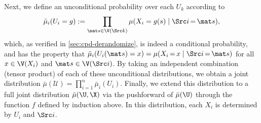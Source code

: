 \begin{subappendices}
\begin{lproof}
    Next, we define an unconditional probability over each $U_k$ according to
    \[
        \bar\mu_i(U_i = g) := \prod_{\mat s \in \V(\Src k)} \mu(X_i = g(s) \mid \Src i \,{=}\, \mat s),
    \]
    which, as verified in \cref{sec:cpd-derandomize}, is indeed a conditional probability, and has the property that
    $\bar\mu_i(U_i(\mat s) = x) = \mu(X_i \,{=}\, x \mid \Src i \,{=}\, \mat s)$ for all $x \in \V(X_i)$ and $\mat s \in \V(\Src i)$.
    By taking an independent combination (tensor product) of each of these unconditional distributions, we obtain a joint distribution 
    $\bar\mu(\mathcal U) = \prod_{i=1}^n \bar\mu_i(U_i)$.
    Finally, we extend this distribution to a full joint distribution
        $\bar\mu(\U, \X)$ via the pushforward of $\bar \mu(\U)$ through the function $f$ defined by induction above.
    In this distribution, each $X_i$ is determined by $U_i$ and $\Src i$. 
    

\end{lproof}
\end{subappendices}
